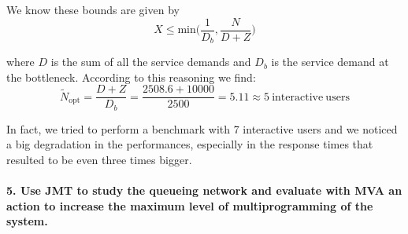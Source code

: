 \documentclass[11pt]{scrartcl} %
\begin{document}

We know these bounds are given by $$X\leq \mathrm{min}\bigg(\dfrac{1}{D_b}, \dfrac{N}{D+Z}\bigg)$$

where $D$ is the sum of all the service demands and $D_b$ is the service demand at the bottleneck. According to this reasoning we find: $$\widetilde{N}_{\mathrm{opt}}=\dfrac{D+Z}{D_b}=\dfrac{2508.6+10000}{2500}=5.11\approx 5\ \mathrm{interactive\ users}$$

In fact, we tried to perform a benchmark with 7 interactive users and we noticed a big degradation in the performances, especially in the response times that resulted to be even three times bigger.


\paragraph*{5. Use JMT to study the queueing network and evaluate with MVA an action to increase the maximum level of multiprogramming of the system.} \mbox{}\\\\
\end{document}
